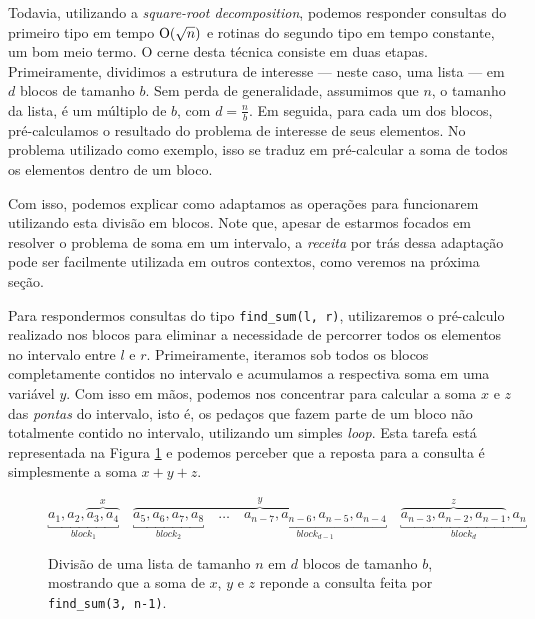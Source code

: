 Todavia, utilizando a \emph{square-root decomposition}, podemos responder consultas do primeiro tipo em tempo $\mathrm{O}(\sqrt{n})$ e rotinas do segundo tipo em tempo constante, um bom meio termo. O cerne desta técnica consiste em duas etapas. Primeiramente, dividimos a estrutura de interesse --- neste caso, uma lista --- em $d$ blocos de tamanho $b$. Sem perda de generalidade, assumimos que $n$, o tamanho da lista, é um múltiplo de $b$, com $d = \frac{n}{b}$. Em seguida, para cada um dos blocos, pré-calculamos o resultado do problema de interesse de seus elementos. No problema utilizado como exemplo, isso se traduz em pré-calcular a soma de todos os elementos dentro de um bloco.

Com isso, podemos explicar como adaptamos as operações para funcionarem utilizando esta divisão em blocos. Note que, apesar de estarmos focados em resolver o problema de soma em um intervalo, a \emph{receita} por trás dessa adaptação pode ser facilmente utilizada em outros contextos, como veremos na próxima seção.

Para respondermos consultas do tipo \texttt{find\_sum(l, r)}, utilizaremos o pré-calculo realizado nos blocos para eliminar a necessidade de percorrer todos os elementos no intervalo entre $l$ e $r$. Primeiramente, iteramos sob todos os blocos completamente contidos no intervalo e acumulamos a respectiva soma em uma variável $y$. Com isso em mãos, podemos nos concentrar para calcular a soma $x$ e $z$ das \emph{pontas} do intervalo, isto é, os pedaços que fazem parte de um bloco não totalmente contido no intervalo, utilizando um simples \emph{loop}. Esta tarefa está representada na Figura \ref{fig:sqrt-decomp-blocks} e podemos perceber que a reposta para a consulta é simplesmente a soma $x + y + z$.

\begin{figure}
    \centering
    \begin{equation*}
        \underbracket{a_1, a_2, \overbrace{a_3, a_4}^x}_{block_1} \quad
        \overbrace{
            \underbracket{a_5, a_6, a_7, a_8}_{block_2} \quad
            \dots \quad
            \underbracket{a_{n-7}, a_{n-6}, a_{n-5}, a_{n-4}}_{block_{d-1}}
        }^y \quad
        \underbracket{\overbrace{a_{n-3}, a_{n-2}, a_{n-1}}^z, a_n}_{block_d}
    \end{equation*}
    \caption{Divisão de uma lista de tamanho $n$ em $d$ blocos de tamanho $b$, mostrando que a soma de $x$, $y$ e $z$ reponde a consulta feita por \texttt{find\_sum(3, n-1)}.}
    \label{fig:sqrt-decomp-blocks}
\end{figure}

